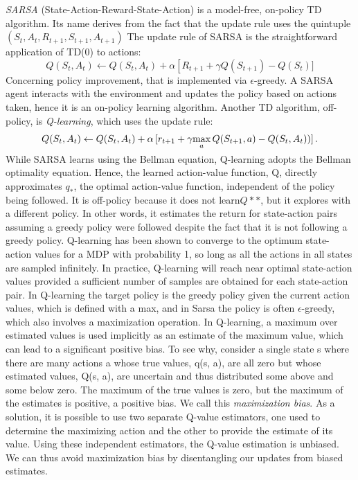 \textit{SARSA} (State-Action-Reward-State-Action) is a model-free, on-policy TD algorithm. Its name derives from the fact that the update rule uses the quintuple $(S_t,A_t,R_{t+1},S_{t+1},A_{t+1})$
The update rule of SARSA is the straightforward application of TD(0) to actions:
\begin{equation}Q(S_t,A_t)\leftarrow Q(S_t,A_t)+\alpha\left[R_{t+1}+\gamma Q(S_{t+1})-Q(S_t)\right.]\end{equation} Concerning policy improvement, that is implemented via $\epsilon$-greedy.
A SARSA agent interacts with the environment and updates the policy based on actions taken, hence it is an on-policy learning algorithm.
Another TD algorithm, off-policy, is \textit{Q-learning}, which uses the update rule:
\begin{equation}Q(S_t,A_t)\leftarrow Q(S_t,A_t)+\alpha\left[r_{t+1}+\gamma \smash{\displaystyle \max_{a} Q(S_{t+1},a)-Q(S_t,A_t))}\right].\end{equation} While SARSA learns using the Bellman equation, Q-learning adopts the Bellman optimality equation. Hence, the learned action-value function, Q, directly approximates $  q_*$, the optimal action-value function, independent of the policy being followed. 
It is off-policy because it does not learn$Q**$, but it explores with a different policy. In other words, it estimates the return for state-action pairs assuming a greedy policy were followed despite the fact that it is not following a greedy policy.
Q-learning has been shown to converge to the optimum state-action values for a MDP with probability 1, so long as all the actions in all states are sampled infinitely. In practice, Q-learning will reach near optimal state-action values provided a sufficient number of samples are obtained for each state-action pair.
In Q-learning the target policy is the greedy policy given the current action values, which is defined with a max, and in Sarsa the policy is often $\epsilon$-greedy, which also involves a maximization operation. In Q-learning, a maximum over estimated values is used implicitly as an estimate of the maximum value, which can lead to a significant positive bias. To see why, consider a single state s where there are many actions a whose true values, q(s, a), are all zero but whose estimated values, Q(s, a), are uncertain and thus distributed some above and some below zero. The maximum of the true values is zero, but the maximum of the estimates is positive, a positive bias. We call this \textit{maximization bias}. As a solution, it is possible to use two separate Q-value estimators, one used to determine the maximizing action and the other to provide the estimate of its value. Using these independent estimators, the Q-value estimation is unbiased. We can thus avoid maximization bias by disentangling our updates from biased estimates.
